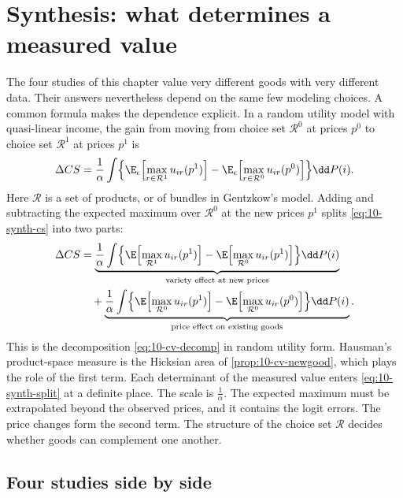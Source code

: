 \section{Synthesis: what determines a measured value}\label{sec:10-synthesis}

The four studies of this chapter value very different goods with very different data. Their answers nevertheless depend
on the same few modeling choices. A common formula makes the dependence explicit. In a random utility model with
quasi-linear income, the gain from moving from choice set $\mathcal{R}^0$ at prices $p^0$ to choice set $\mathcal{R}^1$
at prices $p^1$ is
\begin{equation}\label{eq:10-synth-cs}
  \Delta CS = \frac{1}{\alpha}\int\Bigl\{\E_\epsilon\Bigl[\max_{r\in\mathcal{R}^1}u_{ir}(p^1)\Bigr]
  - \E_\epsilon\Bigl[\max_{r\in\mathcal{R}^0}u_{ir}(p^0)\Bigr]\Bigr\}\dd P(i) .
\end{equation}
Here $\mathcal{R}$ is a set of products, or of bundles in Gentzkow's model. Adding and subtracting the expected maximum
over $\mathcal{R}^0$ at the new prices $p^1$ splits \eqref{eq:10-synth-cs} into two parts:
\begin{align}
  \Delta CS &= \underbrace{\frac{1}{\alpha}\int\Bigl\{\E\Bigl[\max_{\mathcal{R}^1}u_{ir}(p^1)\Bigr]
              - \E\Bigl[\max_{\mathcal{R}^0}u_{ir}(p^1)\Bigr]\Bigr\}\dd P(i)}_{\text{variety effect at new prices}} \notag\\
            &\quad + \underbrace{\frac{1}{\alpha}\int\Bigl\{\E\Bigl[\max_{\mathcal{R}^0}u_{ir}(p^1)\Bigr]
              - \E\Bigl[\max_{\mathcal{R}^0}u_{ir}(p^0)\Bigr]\Bigr\}\dd P(i)}_{\text{price effect on existing goods}} .
  \label{eq:10-synth-split}
\end{align}
This is the decomposition \eqref{eq:10-cv-decomp} in random utility form. Hausman's product-space measure is the
Hicksian area of \cref{prop:10-cv-newgood}, which plays the role of the first term. Each determinant of the measured
value enters \eqref{eq:10-synth-split} at a definite place. The scale is $\frac{1}{\alpha}$. The expected maximum must be
extrapolated beyond the observed prices, and it contains the logit errors. The price changes form the second term. The
structure of the choice set $\mathcal{R}$ decides whether goods can complement one another.

\subsection{Four studies side by side}\label{sec:10-synthesis-table}

